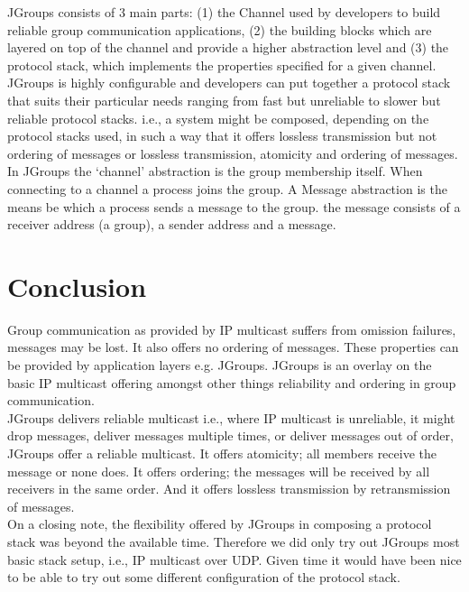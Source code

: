 JGroups consists of 3 main parts: (1) the Channel used by developers to build reliable group communication applications, (2) the building blocks which are layered on top of the channel and provide a higher abstraction level and (3) the protocol stack, which implements the properties specified for a given channel.\\

JGroups is highly configurable and developers can put together a protocol stack that suits their particular needs ranging from fast but unreliable to slower but reliable protocol stacks. i.e., a system might be composed, depending on the protocol stacks used, in such a way that it offers lossless transmission but not ordering of messages or lossless transmission, atomicity and ordering of messages.\\

In JGroups the ‘channel’ abstraction is the group membership itself. When connecting to a channel a process joins the group. A Message abstraction is the means be which a process sends a message to the group. the message consists of a receiver address (a group), a sender address and a message. 


\section{Conclusion}
\label{jgroup_conclusion}
Group communication as provided by IP multicast suffers from omission failures, messages may be lost. It also offers no ordering of messages. These properties can be provided by application layers e.g. JGroups. JGroups is an overlay on the basic IP multicast offering amongst other things reliability and ordering in group communication. \\

JGroups delivers reliable multicast i.e., where IP multicast is unreliable, it might drop messages, deliver messages multiple times, or deliver messages out of order, JGroups offer a reliable multicast. It offers atomicity; all members receive the message or none does. It offers ordering; the messages will be received by all receivers in the same order. And it offers lossless transmission by retransmission of messages.\\

On a closing note, the flexibility offered by JGroups in composing a protocol stack was beyond the available time. Therefore we did only try out JGroups most basic stack setup, i.e., IP multicast over UDP. Given time it would have been nice to be able to try out some different configuration of the protocol stack.  

